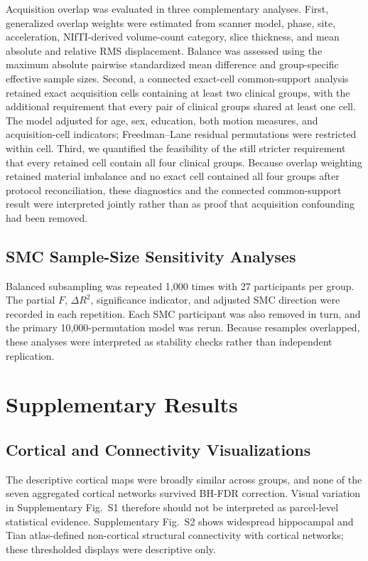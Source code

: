 \documentclass{article}
\begin{document}
Acquisition overlap was evaluated in three complementary analyses. First, generalized overlap weights were estimated from scanner model, phase, site, acceleration, NIfTI-derived volume-count category, slice thickness, and mean absolute and relative RMS displacement. Balance was assessed using the maximum absolute pairwise standardized mean difference and group-specific effective sample sizes. Second, a connected exact-cell common-support analysis retained exact acquisition cells containing at least two clinical groups, with the additional requirement that every pair of clinical groups shared at least one cell. The model adjusted for age, sex, education, both motion measures, and acquisition-cell indicators; Freedman--Lane residual permutations were restricted within cell. Third, we quantified the feasibility of the still stricter requirement that every retained cell contain all four clinical groups. Because overlap weighting retained material imbalance and no exact cell contained all four groups after protocol reconciliation, these diagnostics and the connected common-support result were interpreted jointly rather than as proof that acquisition confounding had been removed.

\subsection{SMC Sample-Size Sensitivity Analyses}
Balanced subsampling was repeated 1,000 times with 27 participants per group. The partial \(F\), \(\Delta R^2\), significance indicator, and adjusted SMC direction were recorded in each repetition. Each SMC participant was also removed in turn, and the primary 10,000-permutation model was rerun. Because resamples overlapped, these analyses were interpreted as stability checks rather than independent replication.

\section{Supplementary Results}

\subsection{Cortical and Connectivity Visualizations}
The descriptive cortical maps were broadly similar across groups, and none of the seven aggregated cortical networks survived BH-FDR correction. Visual variation in Supplementary Fig.~S1 therefore should not be interpreted as parcel-level statistical evidence. Supplementary Fig.~S2 shows widespread hippocampal and Tian atlas-defined non-cortical structural connectivity with cortical networks; these thresholded displays were descriptive only.
\end{document}
